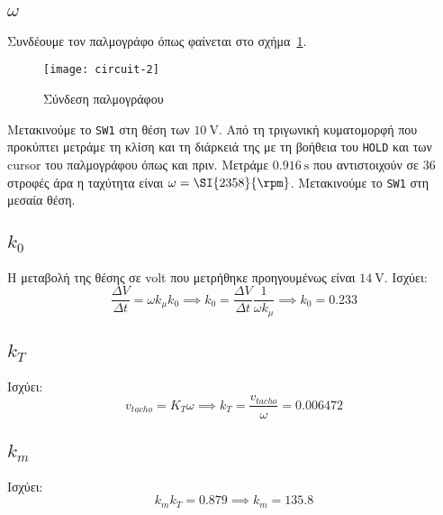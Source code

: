 \newcommand{\texodou}{T_{εξ\acute{ο}δου}}
\subsection{$\omega$}
Συνδέουμε τον παλμογράφο όπως φαίνεται στο σχήμα~\ref{fig:circuit-2}.
\begin{figure}[htb]
    \centering
    \texttt{[image: circuit-2]}
    \caption{Σύνδεση παλμογράφου}
    \label{fig:circuit-2}
\end{figure}
Μετακινούμε το \texttt{SW1} στη θέση των $\SI{+10}{\volt}$.
Από τη τριγωνική κυματομορφή που προκύπτει μετράμε τη κλίση και τη διάρκειά της με τη βοήθεια του \texttt{HOLD} και των cursor του παλμογράφου όπως και πριν.
Μετράμε $\SI{0.916}{\second}$ που αντιστοιχούν σε $36$ στροφές άρα η ταχύτητα είναι
$\omega = \SI{2358}{\rpm}$.
Μετακινούμε το \texttt{SW1} στη μεσαία θέση.

\subsection{$k_0$}
Η μεταβολή της θέσης σε volt που μετρήθηκε προηγουμένως είναι $\SI{14}{\volt}$.
Ισχύει:
\begin{equation*}
\frac{\Delta V}{\Delta t} = \omega k_{\mu} k_0 \implies k_0 = \frac{\Delta V}{\Delta t} \frac{1}{\omega k_{\mu}} \implies k_0 = 0.233
\end{equation*}

\subsection{$k_T$}
Ισχύει:
\begin{equation*}
v_{tacho} = K_T \omega \implies k_T = \frac{v_{tacho}}{\omega} = 0.006472
\end{equation*}

\subsection{$k_m$}
Ισχύει:
\begin{equation*}
k_m k_T = 0.879 \implies k_m = 135.8
\end{equation*}

